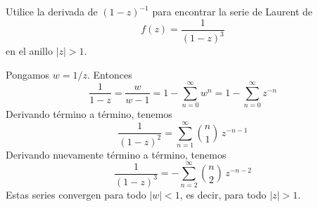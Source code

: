\begin{exercise}
Utilice la derivada de $(1-z)^{-1}$ para encontrar la serie de Laurent de
$$f(z) = \frac 1 {(1-z)^3}$$
en el anillo $|z| > 1$.
\end{exercise}

\begin{solution}
Pongamos $w = 1/z$. Entonces
$$\frac 1 {1-z} = \frac w {w-1} = 1 - \sum_{n=0}^\infty w^n = 1 - \sum_{n=0}^\infty z^{-n}$$
Derivando término a término, tenemos
$$\frac 1 {(1-z)^2} = \sum_{n=1}^\infty \binom n1 \, z^{-n-1}$$
Derivando nuevamente término a término, tenemos
$$\frac 1 {(1-z)^3} = -\sum_{n=2}^\infty \binom n2 \, z^{-n-2}$$
Estas series convergen para todo $|w| < 1$, es decir, para todo $|z| > 1$.
\end{solution}
